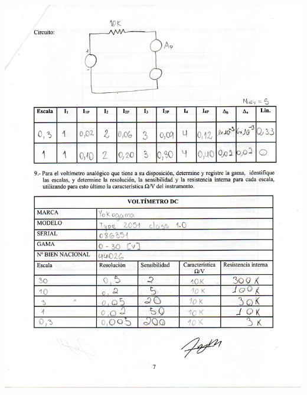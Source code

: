 \documentclass[12pt]{article}
\begin{document}
	\begin{center}
		\includegraphics[width=16cm,height=20cm]{Img/datos_lab_0004}
	\end{center}
\end{document}

